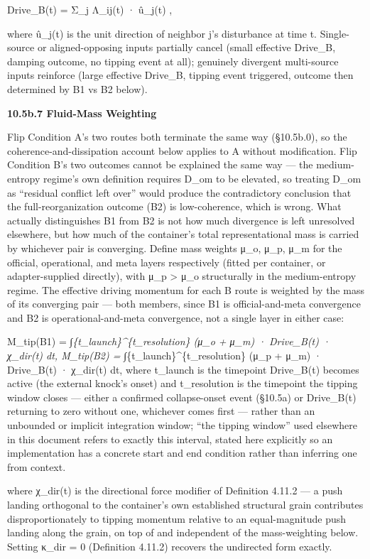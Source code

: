 \documentclass[
]{article}
\begin{document}
Drive\_B(t) = \textbar{} Σ\_j Λ\_ij(t) · û\_j(t) \textbar,

where û\_j(t) is the unit direction of neighbor j's disturbance at time
t. Single-source or aligned-opposing inputs partially cancel (small
effective Drive\_B, damping outcome, no tipping event at all); genuinely
divergent multi-source inputs reinforce (large effective Drive\_B,
tipping event triggered, outcome then determined by B1 vs B2 below).

\textbf{10.5b.7 Fluid-Mass Weighting}

Flip Condition A's two routes both terminate the same way (§10.5b.0), so
the coherence-and-dissipation account below applies to A without
modification. Flip Condition B's two outcomes cannot be explained the
same way --- the medium-entropy regime's own definition requires D\_om
to be elevated, so treating D\_om as ``residual conflict left over''
would produce the contradictory conclusion that the full-reorganization
outcome (B2) is low-coherence, which is wrong. What actually
distinguishes B1 from B2 is not how much divergence is left unresolved
elsewhere, but how much of the container's total representational mass
is carried by whichever pair is converging. Define mass weights μ\_o,
μ\_p, μ\_m for the official, operational, and meta layers respectively
(fitted per container, or adapter-supplied directly), with μ\_p
\textgreater{} μ\_o structurally in the medium-entropy regime. The
effective driving momentum for each B route is weighted by the mass of
its converging pair --- both members, since B1 is official-and-meta
convergence and B2 is operational-and-meta convergence, not a single
layer in either case:

M\_tip(B1) = ∫\emph{\{t\_launch\}\^{}\{t\_resolution\} (μ\_o + μ\_m) ·
Drive\_B(t) · χ\_dir(t) dt, M\_tip(B2) =
∫}\{t\_launch\}\^{}\{t\_resolution\} (μ\_p + μ\_m) · Drive\_B(t) ·
χ\_dir(t) dt, where t\_launch is the timepoint Drive\_B(t) becomes
active (the external knock's onset) and t\_resolution is the timepoint
the tipping window closes --- either a confirmed collapse-onset event
(§10.5a) or Drive\_B(t) returning to zero without one, whichever comes
first --- rather than an unbounded or implicit integration window; ``the
tipping window'' used elsewhere in this document refers to exactly this
interval, stated here explicitly so an implementation has a concrete
start and end condition rather than inferring one from context.

where χ\_dir(t) is the directional force modifier of Definition 4.11.2
--- a push landing orthogonal to the container's own established
structural grain contributes disproportionately to tipping momentum
relative to an equal-magnitude push landing along the grain, on top of
and independent of the mass-weighting below. Setting κ\_dir = 0
(Definition 4.11.2) recovers the undirected form exactly.
\end{document}
